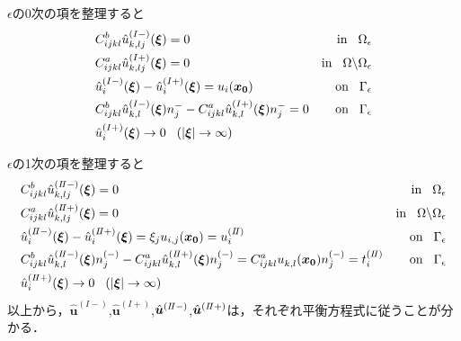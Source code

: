 $\epsilon$の0次の項を整理すると
\begin{align}
&C_{ijkl}^{b} \hat{u}^{(I-)}_{k,lj}(\bm{\xi})=0&\text{in}\hspace{0.3cm}\Omega_{\epsilon}
\label{eq:GovDisturIn1}
\\
&C_{ijkl}^{a} \hat{u}^{(I+)}_{k,lj}(\bm{\xi})=0&\text{in}\hspace{0.3cm}\Omega\backslash\Omega_{\epsilon}
\label{eq:GovDisturOut1}
\\
&\hat{u}_{i}^{(I-)}(\bm{\xi})-\hat{u}_{i}^{(I+)}(\bm{\xi})=u_{i}(\bm{x_0}) &\text{on}\hspace{0.3cm}\Gamma_{\epsilon}
\label{eq:GovDisturUBC1}
\\
&C_{ijkl}^{b}\hat{u}_{k,l}^{(I-)}(\bm{\xi})n_{j}^{-}
-C_{ijkl}^{a}\hat{u}_{k,l}^{(I+)}(\bm{\xi})n_{j}^{-}=0 &\text{on}\hspace{0.3cm}\Gamma_{\epsilon}
\label{eq:GovDisturSBC1}
\\
&\hat{u}_{i}^{(I+)}(\bm{\xi})\rightarrow 0 \hspace{0.3cm} (|\bm{\xi}|\rightarrow \infty)
\label{eq:GovDisturInftyBC1}
\end{align}

$\epsilon$の1次の項を整理すると
\begin{align}
&C_{ijkl}^{b} \hat{u}^{(I\hspace{-.15em}I-)}_{k,lj}(\bm{\xi})=0
&\text{in}\hspace{0.3cm}\Omega_{\epsilon}
\label{eq:GovDisturIn2}
\\
&C_{ijkl}^{a} \hat{u}^{(I\hspace{-.15em}I+)}_{k,lj}(\bm{\xi})=0
&\text{in}\hspace{0.3cm}\Omega\backslash\Omega_{\epsilon}
\label{eq:GovDisturOut2}
\\
&\hat{u}_{i}^{(I\hspace{-.15em}I-)}(\bm{\xi})
-\hat{u}_{i}^{(I\hspace{-.15em}I+)}(\bm{\xi})= \xi_j u_{i,j}(\bm{x_0})=u_{i}^{(I\hspace{-.15em}I)} &\text{on}\hspace{0.3cm}\Gamma_{\epsilon}
\label{eq:GovDisturUBC2}
\\
&C_{ijkl}^{b}\hat{u}_{k,l}^{(I\hspace{-.15em}I-)}(\bm{\xi})n_{j}^{(-)}
-C_{ijkl}^{a}\hat{u}_{k,l}^{(I\hspace{-.15em}I+)}(\bm{\xi})n_{j}^{(-)}
=C_{ijkl}^{a} u_{k,l}^{}(\bm{x_0})n_{j}^{(-)}=t_{i}^{(I\hspace{-.15em}I)} &\text{on}\hspace{0.3cm}\Gamma_{\epsilon}
\label{eq:GovDisturSBC2}
\\
&\hat{u}_{i}^{(I\hspace{-.15em}I+)}(\bm{\xi})\rightarrow 0 \hspace{0.3cm} (|\bm{\xi}|\rightarrow \infty)
\label{eq:GovDisturInftyBC2}
\end{align}
以上から，$\hat{\bm{u}}^{(I-)}$,$\hat{\bm{u}}^{(I+)}$,$\hat{\bm{u}}^{(I\hspace{-.15em}I-)}$,$\hat{\bm{u}}^{(I\hspace{-.15em}I+)}$は，それぞれ平衡方程式に従うことが分かる．

\newpage

